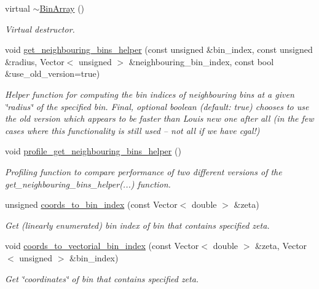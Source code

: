 \begin{DoxyCompactItemize}
virtual \hyperlink{classBinArray_ab29e48e0bc2242673fac09b245714d4e}{$\sim$\+Bin\+Array} ()
\begin{DoxyCompactList}\small\item\em Virtual destructor. \end{DoxyCompactList}\item 
void \hyperlink{classBinArray_a704060ec54de24dd65c73af63a25d2b2}{get\+\_\+neighbouring\+\_\+bins\+\_\+helper} (const unsigned \&bin\+\_\+index, const unsigned \&radius, Vector$<$ unsigned $>$ \&neighbouring\+\_\+bin\+\_\+index, const bool \&use\+\_\+old\+\_\+version=true)
\begin{DoxyCompactList}\small\item\em Helper function for computing the bin indices of neighbouring bins at a given \char`\"{}radius\char`\"{} of the specified bin. Final, optional boolean (default\+: true) chooses to use the old version which appears to be faster than Louis\textquotesingle{} new one after all (in the few cases where this functionality is still used -- not all if we have cgal!) \end{DoxyCompactList}\item 
void \hyperlink{classBinArray_af2a223b6a244b75d4c1e358a95aa57f1}{profile\+\_\+get\+\_\+neighbouring\+\_\+bins\+\_\+helper} ()
\begin{DoxyCompactList}\small\item\em Profiling function to compare performance of two different versions of the get\+\_\+neighbouring\+\_\+bins\+\_\+helper(...) function. \end{DoxyCompactList}\item 
unsigned \hyperlink{classBinArray_ae57a55f73048b7c209fdff93725c4049}{coords\+\_\+to\+\_\+bin\+\_\+index} (const Vector$<$ double $>$ \&zeta)
\begin{DoxyCompactList}\small\item\em Get (linearly enumerated) bin index of bin that contains specified zeta. \end{DoxyCompactList}\item 
void \hyperlink{classBinArray_afc41ba4569c25acdf56000a6a82e7859}{coords\+\_\+to\+\_\+vectorial\+\_\+bin\+\_\+index} (const Vector$<$ double $>$ \&zeta, Vector$<$ unsigned $>$ \&bin\+\_\+index)
\begin{DoxyCompactList}\small\item\em Get \char`\"{}coordinates\char`\"{} of bin that contains specified zeta. \end{DoxyCompactList}\item 

\end{DoxyCompactItemize}
